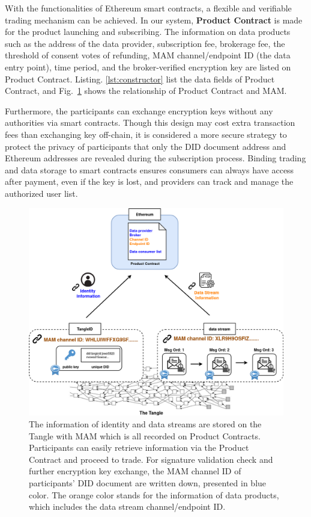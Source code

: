 \begin{spacing}{2.0}
With the functionalities of Ethereum smart contracts, a flexible and verifiable trading mechanism can be achieved. In our system, \textbf{Product Contract} is made for the product launching and subscribing. The information on data products such as the address of the data provider, subscription fee, brokerage fee, the threshold of consent votes of refunding, MAM channel/endpoint ID (the data entry point), time period, and the broker-verified encryption key are listed on Product Contract. Listing. \ref{lst:constructor} list the data fields of Product Contract, and Fig.~\ref{fig:smart_contract_mam} shows the relationship of Product Contract and MAM.

Furthermore, the participants can exchange encryption keys without any authorities via smart contracts. Though this design may cost extra transaction fees than exchanging key off-chain, it is considered a more secure strategy to protect the privacy of participants that only the DID document address and Ethereum addresses are revealed during the subscription process. Binding trading and data storage to smart contracts ensures consumers can always have access after payment, even if the key is lost, and providers can track and manage the authorized user list.

\begin{figure}[h]
    \centering
    \includegraphics[width=5.5in]{img/smart_contract_mam}
    \caption{The information of identity and data streams are stored on the Tangle with MAM which is all recorded on Product Contracts. Participants can easily retrieve information via the Product Contract and proceed to trade. For signature validation check and further encryption key exchange, the MAM channel ID of participants' DID document are written down, presented in blue color. The orange color stands for the information of data products, which includes the data stream channel/endpoint ID.}
    \label{fig:smart_contract_mam}
\end{figure}
\clearpage


\end{spacing}
